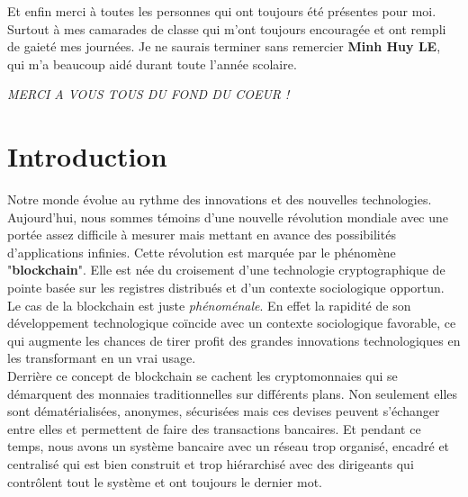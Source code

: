 \documentclass[12pt]{report}
\begin{document}
\hspace{1cm} Et enfin merci à toutes les personnes qui ont toujours été présentes pour moi. Surtout à mes camarades de classe qui m'ont toujours encouragée et ont rempli de gaieté mes journées. Je ne saurais terminer sans remercier \textbf{Minh Huy LE}, qui m'a beaucoup aidé durant toute l'année scolaire. \\

  \begin{flushright} \large
    \emph{MERCI A VOUS TOUS DU FOND DU COEUR !} \\
  \end{flushright}


\newpage
\renewcommand{\contentsname}{Table des matières}
\tableofcontents
\pagebreak


\section{Introduction}
\hspace{1cm} Notre monde évolue au rythme des innovations et des nouvelles technologies. Aujourd'hui, nous sommes témoins d'une nouvelle révolution mondiale avec une portée assez difficile à mesurer mais mettant en avance des possibilités d'applications infinies. Cette révolution est marquée par le phénomène "\textbf{blockchain}". Elle est née du croisement d'une technologie cryptographique de pointe basée sur les registres distribués et d'un contexte sociologique opportun. Le cas de la blockchain est juste \textit{phénoménale}. En effet la rapidité de son développement technologique coïncide avec un contexte sociologique favorable, ce qui augmente les chances de tirer profit des grandes innovations technologiques en les transformant en un vrai usage. \\

\hspace{1cm} Derrière ce concept de blockchain se cachent les cryptomonnaies qui se \\démarquent des monnaies traditionnelles sur différents plans. Non seulement elles sont dématérialisées, anonymes, sécurisées mais ces devises peuvent s'échanger entre elles et permettent de faire des transactions bancaires. Et pendant ce temps, nous avons un système bancaire avec un réseau trop organisé, encadré et centralisé qui est bien construit et trop hiérarchisé avec des dirigeants qui contrôlent tout le système et ont toujours le dernier mot.\\
\end{document}
